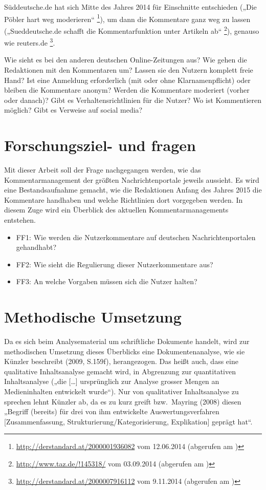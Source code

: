 \documentclass[12pt,titlepage=no,parskip=full]{scrartcl} %
\begin{document}
Süddeutsche.de hat sich Mitte des Jahres 2014 für Einschnitte entschieden („Die Pöbler hart weg moderieren“ 
\footnote{\url{http://derstandard.at/2000001936082} vom 12.06.2014 (abgerufen am )}), um dann die Kommentare ganz weg zu lassen („Sueddeutsche.de schafft die Kommentarfunktion unter Artikeln ab“ \footnote{\url{http://www.taz.de/!145318/} vom
03.09.2014 (abgerufen am )}), genauso wie reuters.de \footnote{\url{http://derstandard.at/2000007916112} vom 9.11.2014 (abgerufen am )}.



Wie sieht es bei den anderen deutschen Online-Zeitungen aus? Wie gehen die
Redaktionen mit den Kommentaren um? Lassen sie den Nutzern komplett freie Hand?
Ist eine Anmeldung erforderlich (mit oder ohne Klarnamenpflicht) oder bleiben
die Kommentare anonym? Werden die Kommentare moderiert (vorher oder danach)?
Gibt es Verhaltensrichtlinien für die Nutzer? Wo ist Kommentieren möglich? Gibt
es Verweise auf social media?






\section{Forschungsziel- und fragen}

Mit dieser Arbeit soll der Frage nachgegangen werden, wie das Kommentarmanagement
der größten Nachrichtenportale jeweils aussieht. Es wird eine Bestandsaufnahme
gemacht, wie die Redaktionen Anfang des Jahres 2015 die Kommentare handhaben und
welche Richtlinien dort vorgegeben werden. In diesem Zuge wird ein Überblick des
aktuellen Kommentarmanagements entstehen.

\begin{itemize} \em
  \item FF1: Wie werden die Nutzerkommentare auf deutschen Nachrichtenportalen gehandhabt?
  \item FF2: Wie sieht die Regulierung dieser Nutzerkommentare aus?
  \item FF3: An welche Vorgaben müssen sich die Nutzer halten?
\end{itemize}


\section{Methodische Umsetzung}

Da es sich beim Analysematerial um schriftliche Dokumente handelt, wird zur
methodischen Umsetzung dieses Überblicks eine Dokumentenanalyse, wie sie Künzler
beschreibt (2009, S.159f), herangezogen. Das heißt auch, dass eine qualitative
Inhaltsanalyse gemacht wird, in Abgrenzung zur quantitativen Inhaltsanalyse
(„die [\ldots] ursprünglich zur Analyse grosser Mengen an Medieninhalten entwickelt
wurde“). Nur von qualitativer Inhaltsanalyse zu sprechen lehnt Künzler ab, da es
zu kurz greift bzw.~Mayring (2008) diesen „Begriff (bereits) für drei von ihm
entwickelte Auswertungsverfahren [Zusammenfassung,
Strukturierung/Kategorisierung, Explikation] geprägt hat“.
\end{document}
